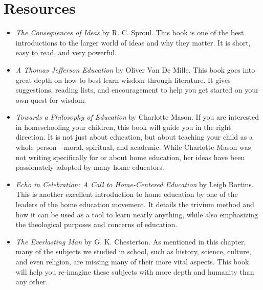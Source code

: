 \section{Resources}

\begin{itemize}
\item
\textit{The Consequences of Ideas} by R. C. Sproul.  This book is
one of the best introductions to the larger world of ideas and why
they matter.  It is short, easy to read, and very powerful.
\item
\textit{A Thomas Jefferson Education} by Oliver Van De Mille.  This
book goes into great depth on how to best learn wisdom through
literature.  It gives suggestions, reading lists, and encouragement
to help you get started on your own quest for wisdom.
\item
\textit{Towards a Philosophy of Education} by Charlotte Mason.  If you are 
interested in homeschooling your children, this book will guide
you in the right direction.  It is not just about education, but
about teaching your child as a whole person---moral, spiritual, and
academic.  While Charlotte Mason was not writing specifically for or
about home education, her ideas have been passionately adopted by
many home educators.
\item
\textit{Echo in Celebration: A Call to Home-Centered Education} by
Leigh Bortins.  This is another excellent introduction to home
education by one of the leaders of the home education movement.  It
details the trivium method and how it can be used as a tool to learn nearly
anything, while also emphasizing the theological purposes and
concerns of education.
\item
\textit{The Everlasting Man} by G. K. Chesterton.  As mentioned in
this chapter, many of the subjects we studied in school, such as 
history, science, culture, and even religion, are missing many
of their more vital aspects.  This book will help you re-imagine
these subjects with more depth and humanity than any other.  
\end{itemize}
